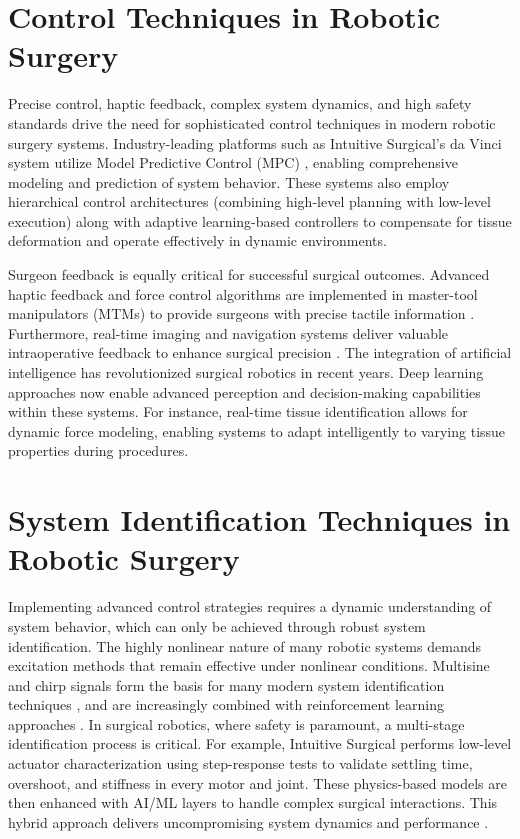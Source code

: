 \section{Control Techniques in Robotic Surgery}

Precise control, haptic feedback, complex system dynamics, and high safety standards drive the need for sophisticated control techniques in modern robotic surgery systems. Industry-leading platforms such as Intuitive Surgical's da Vinci system utilize Model Predictive Control (MPC) \cite{Kazanzides2014DVRK}, enabling comprehensive modeling and prediction of system behavior. These systems also employ hierarchical control architectures (combining high-level planning with low-level execution) along with adaptive learning-based controllers to compensate for tissue deformation and operate effectively in dynamic environments.

Surgeon feedback is equally critical for successful surgical outcomes. Advanced haptic feedback and force control algorithms are implemented in master-tool manipulators (MTMs) to provide surgeons with precise tactile information \cite{Okamura2001HapticSurgery}. Furthermore, real-time imaging and navigation systems deliver valuable intraoperative feedback to enhance surgical precision \cite{Maier2015ImageGuidedSurgery}. The integration of artificial intelligence has revolutionized surgical robotics in recent years. Deep learning approaches now enable advanced perception and decision-making capabilities within these systems. For instance, real-time tissue identification \cite{Wang2020DeepLearningTissue} allows for dynamic force modeling, enabling systems to adapt intelligently to varying tissue properties during procedures.

\section{System Identification Techniques in Robotic Surgery}

Implementing advanced control strategies requires a dynamic understanding of system behavior, which can only be achieved through robust system identification. The highly nonlinear nature of many robotic systems demands excitation methods that remain effective under nonlinear conditions. Multisine and chirp signals form the basis for many modern system identification techniques \cite{Xia1997ChirpSignals}, and are increasingly combined with reinforcement learning approaches \cite{MARTINSEN20208130}. In surgical robotics, where safety is paramount, a multi-stage identification process is critical. For example, Intuitive Surgical performs low-level actuator characterization using step-response tests to validate settling time, overshoot, and stiffness in every motor and joint. These physics-based models are then enhanced with AI/ML layers to handle complex surgical interactions. This hybrid approach delivers uncompromising system dynamics and performance \cite{US20230309921A1}.

